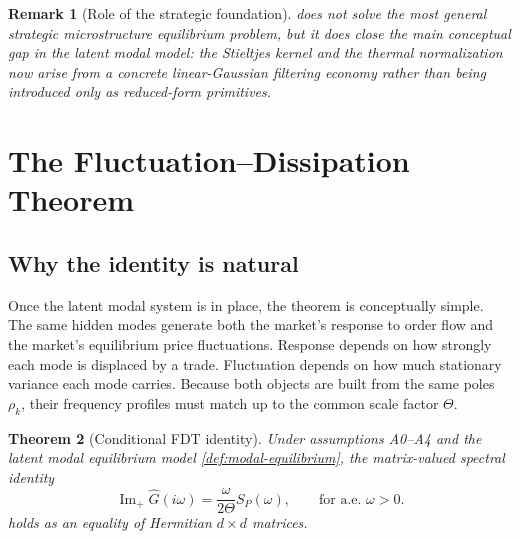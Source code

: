 \documentclass[11pt]{article}
\newtheorem{theorem}{Theorem}[section]
\newtheorem{remark}[theorem]{Remark}
\newcommand{\Ghat}{\widehat{G}}
\newcommand{\ImPart}{\operatorname{Im}_{\!+}}
\begin{document}
\begin{remark}[Role of the strategic foundation]
 does not solve the most general strategic microstructure equilibrium problem, but it does close the main conceptual gap in the latent modal model: the Stieltjes kernel and the thermal normalization now arise from a concrete linear-Gaussian filtering economy rather than being introduced only as reduced-form primitives.
\end{remark}

\section{The Fluctuation--Dissipation Theorem}\label{sec:fdt}

\subsection{Why the identity is natural}
Once the latent modal system is in place, the theorem is conceptually simple. The same hidden modes generate both the market's response to order flow and the market's equilibrium price fluctuations. Response depends on how strongly each mode is displaced by a trade. Fluctuation depends on how much stationary variance each mode carries. Because both objects are built from the same poles $\rho_k$, their frequency profiles must match up to the common scale factor $\Theta$.

\begin{theorem}[Conditional FDT identity]\label{thm:market-fdt}
Under assumptions A0--A4 and the latent modal equilibrium model \cref{def:modal-equilibrium}, the matrix-valued spectral identity
\begin{equation}\label{eq:fdt-repeat}
  \ImPart \Ghat(i\omega)=\frac{\omega}{2\Theta}S_P(\omega),
  \qquad \text{for a.e.\ }\omega>0.
\end{equation}
\noindent holds as an equality of Hermitian $d\times d$ matrices.
\end{theorem}
\end{document}
